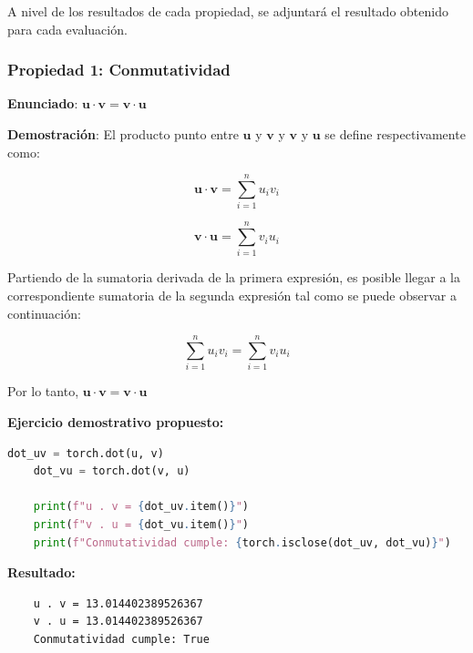 \documentclass[12 pt]{article}
\begin{document}
A nivel de los resultados de cada propiedad, se adjuntará el resultado obtenido para cada evaluación.


\subsubsection*{Propiedad 1: Conmutatividad}

\begin{center}
\textbf{Enunciado}: \(\mathbf{u} \cdot \mathbf{v} = \mathbf{v} \cdot \mathbf{u}\)\\
\end{center}

\textbf{Demostración}: El producto punto entre \(\mathbf{u}\) y \(\mathbf{v}\) y \(\mathbf{v}\) y \(\mathbf{u}\) se define respectivamente como:

\[
\mathbf{u} \cdot \mathbf{v} = \sum_{i=1}^{n} u_i v_i
\]

\[
\mathbf{v} \cdot \mathbf{u} = \sum_{i=1}^{n} v_i u_i
\]

Partiendo de la sumatoria derivada de la primera expresión, es posible llegar a la correspondiente sumatoria de la segunda expresión tal como se puede observar a continuación:

\[
\sum_{i=1}^{n} u_i v_i = \sum_{i=1}^{n} v_i u_i
\]

\begin{center}
Por lo tanto, \(\mathbf{u} \cdot \mathbf{v} = \mathbf{v} \cdot \mathbf{u}\)\\
\end{center}

\textbf{Ejercicio demostrativo propuesto:}
\begin{lstlisting}[language=Python]
    dot_uv = torch.dot(u, v)
    dot_vu = torch.dot(v, u)
    
    print(f"u . v = {dot_uv.item()}")
    print(f"v . u = {dot_vu.item()}")
    print(f"Conmutatividad cumple: {torch.isclose(dot_uv, dot_vu)}")
\end{lstlisting}

\textbf{Resultado:}
\begin{lstlisting}
    u . v = 13.014402389526367
    v . u = 13.014402389526367
    Conmutatividad cumple: True
\end{lstlisting}

\end{document}
